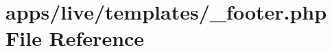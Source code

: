 \hypertarget{live_2templates_2__footer_8php}{\section{apps/live/templates/\-\_\-footer.php File Reference}
\label{live_2templates_2__footer_8php}
}
